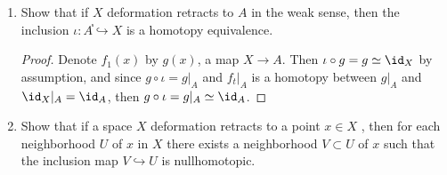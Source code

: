 \documentclass[12pt,letterpaper]{article}
\begin{document}
\begin{enumerate}
\begin{enumerate}[label=(\alph*)]
\item Show that a map homotopic to a homotopy equivalence is a homotopy equivalence. 
\begin{proof}
Let $f,g,\bar{g}:X\to Y$ such that $g\circ\bar{g}\simeq\id$ and $f\simeq g$ with $\begin{array}{ll}
F(x,0)=f(x)\\
F(x,1)=g(x)
\end{array}$. 

Then considering the map $F(\bar{g}(x),t)$\footnote{We know that compositions and restrictions of maps are maps, so we won't get bogged down in mentioning that detail in this or further proofs.}, we find that 
$\begin{array}{ll}
F(\bar{g}(x),0)=f\circ \bar{g}(x)\\
F(\bar{g}(x),1)=g \circ \bar{g}(x)
\end{array}$
so $f\bar{g}\simeq g\bar{g} \simeq \id$, and similarly 
$\begin{array}{ll}
\bar{g}(F(x,0))=\bar{g}\circ f(x)\\
\bar{g}(F(x,1))=\bar{g} \circ g(x)
\end{array}$ so $\bar{g}f\simeq \bar{g}g \simeq \id$. 
\end{proof}
\end{enumerate}

\vfill
\pagebreak
\begin{definition*}
A \emph{deformation retraction in the weak sense} of a space $X$ to a subspace $A$ is a homotopy $f_t: X\to X$ such that $f_0 = \id$, $f_1(X) \subset A$, and $f_t(A) \subset A$ for all $t$. 
\end{definition*}

\item Show that if $X$ deformation retracts to $A$ in the weak sense, then the inclusion $\iota:A ֓\hookrightarrow X$ is a homotopy equivalence.
\begin{proof}
Denote $f_1(x)$ by $g(x)$, a map $X\to A$. Then $\iota \circ g = g\simeq \id_X$ by assumption, and since $g\circ\iota=g|_A$ and $f_t|_A$ is a homotopy between $g|_A$ and $\id_X|_A=\id_A$, then $g\circ\iota=g|_A\simeq\id_A$. 
\end{proof}


\item Show that if a space $X$ deformation retracts to a point $x \in X$ , then for each neighborhood $U$ of $x$ in $X$ there exists a neighborhood $V \subset U$ of $x$ such that the inclusion map $V\hookrightarrow U$ is nullhomotopic.


\end{enumerate}
\end{document}
